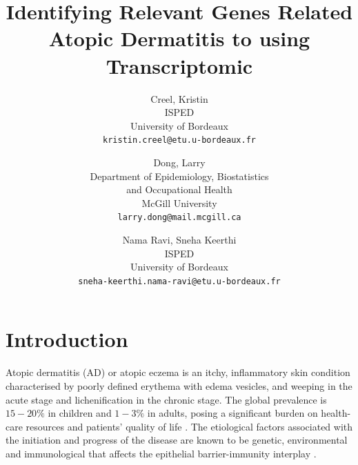 \documentclass[journal, a4paper]{IEEEtran}
\begin{document}
\title{\Large{Identifying Relevant Genes Related Atopic Dermatitis  to  using Transcriptomic}}
\author{%
\begin{tabular}{c} Creel, Kristin \\ ISPED \\ University of Bordeaux \\ \texttt{kristin.creel@etu.u-bordeaux.fr} \end{tabular} \and
\begin{tabular}{c} Dong, Larry \\ Department of Epidemiology, Biostatistics \\ and Occupational Health \\ McGill University \\ \texttt{larry.dong@mail.mcgill.ca} \end{tabular} \and
\begin{tabular}{c} Nama Ravi, Sneha Keerthi \\ ISPED \\ University of Bordeaux \\ \texttt{sneha-keerthi.nama-ravi@etu.u-bordeaux.fr} \end{tabular}}
\maketitle











\section{Introduction}

Atopic dermatitis (AD) or atopic eczema is an itchy, inflammatory skin condition characterised by poorly defined erythema with edema vesicles, and weeping in the acute stage and lichenification in the chronic stage. The global prevalence is $15-20 \%$ in children and $1-3\%$ in adults, posing a significant burden on health-care resources and patients’ quality of life \cite{nutten2015atopic}. The etiological factors associated with the initiation and progress of the disease are known to be genetic, environmental and immunological that affects the epithelial barrier-immunity interplay \cite{peng2015pathogenesis}.\\
\end{document}
